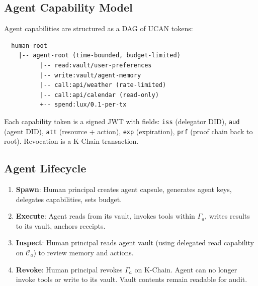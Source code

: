 \subsection{Agent Capability Model}

Agent capabilities are structured as a DAG of UCAN tokens:

\begin{verbatim}
  human-root
    |-- agent-root (time-bounded, budget-limited)
          |-- read:vault/user-preferences
          |-- write:vault/agent-memory
          |-- call:api/weather (rate-limited)
          |-- call:api/calendar (read-only)
          +-- spend:lux/0.1-per-tx
\end{verbatim}

Each capability token is a signed JWT with fields: \texttt{iss} (delegator DID),
\texttt{aud} (agent DID), \texttt{att} (resource + action), \texttt{exp}
(expiration), \texttt{prf} (proof chain back to root). Revocation is a K-Chain
transaction.

\subsection{Agent Lifecycle}

\begin{enumerate}[nosep]
  \item \textbf{Spawn}: Human principal creates agent capsule, generates agent
        keys, delegates capabilities, sets budget.
  \item \textbf{Execute}: Agent reads from its vault, invokes tools within
        $\Gamma_a$, writes results to its vault, anchors receipts.
  \item \textbf{Inspect}: Human principal reads agent vault (using delegated
        read capability on $\mathcal{C}_a$) to review memory and actions.
  \item \textbf{Revoke}: Human principal revokes $\Gamma_a$ on K-Chain.
        Agent can no longer invoke tools or write to its vault. Vault contents
        remain readable for audit.
\end{enumerate}

